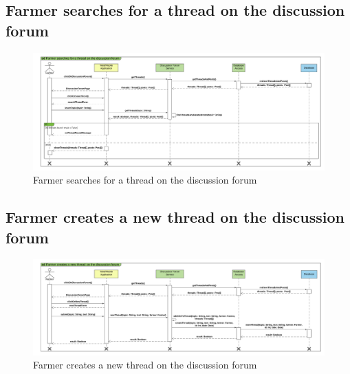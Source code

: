 \subsection{Farmer searches for a thread on the discussion forum}

\newpage
\begin{landscape}
\begin{figure}[h]
\vspace*{-2cm}
\noindent
\centering
\centerline{\includegraphics[scale= 0.108]{./Images/Sequence diagram/Farmer searches for a thread on the discussion forum.png}}
    \caption{Farmer searches for a thread on the discussion forum}
    \vspace*{-12cm}
\end{figure}
\fillandplacepagenumber
\end{landscape}

\subsection{Farmer creates a new thread on the discussion forum}

\newpage
\begin{landscape}
\begin{figure}[h]
\vspace*{-2cm}
\noindent
\centering
\centerline{\includegraphics[scale= 0.108]{./Images/Sequence diagram/Farmer creates a new thread on the discussion forum.png}}
    \caption{Farmer creates a new thread on the discussion forum}
    \vspace*{-12cm}
\end{figure}
\fillandplacepagenumber
\end{landscape}

